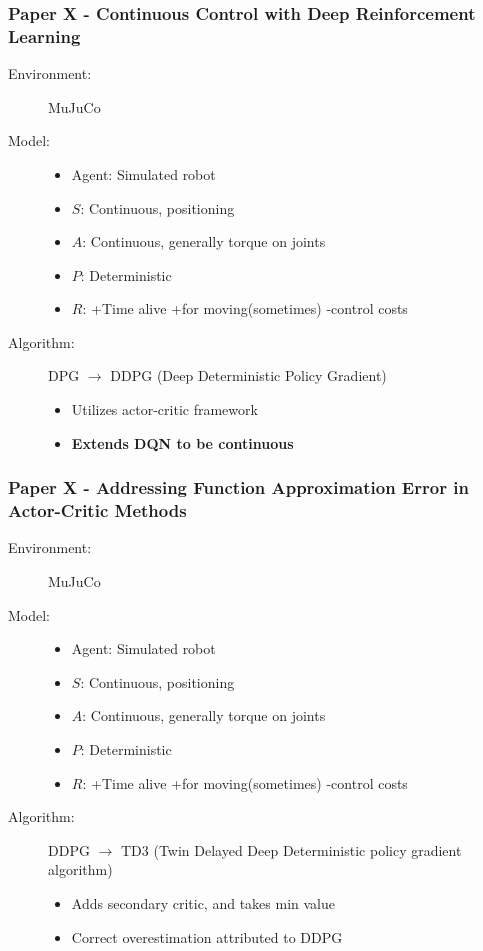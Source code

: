 \documentclass{beamer}
\begin{document}
\begin{frame} %
    \frametitle{Paper X - Continuous Control with Deep Reinforcement Learning%
    }
    \begin{description}
        \item[Environment:] MuJuCo
        \item[Model:]
        \begin{itemize}
            \item Agent: Simulated robot
            \item $S$: Continuous, positioning
            \item $A$: Continuous, generally torque on joints
            \item $P$: Deterministic
            \item $R$: +Time alive +for moving(sometimes) -control costs
        \end{itemize}
        \item[Algorithm:] DPG\cite{silver2014} $\rightarrow$ DDPG 
            (Deep Deterministic Policy Gradient)
        \begin{itemize}
            \item Utilizes actor-critic framework
            \item \textbf{Extends DQN to be continuous}
        \end{itemize}
    \end{description}
\end{frame}

\begin{frame} %
    \frametitle{Paper X - Addressing Function Approximation Error in Actor-Critic 
    Methods}
    \begin{description}
        \item[Environment:] MuJuCo
        \item[Model:]
        \begin{itemize}
            \item Agent: Simulated robot
            \item $S$: Continuous, positioning
            \item $A$: Continuous, generally torque on joints
            \item $P$: Deterministic
            \item $R$: +Time alive +for moving(sometimes) -control costs
        \end{itemize}
        \item[Algorithm:] DDPG $\rightarrow$ TD3 
        (Twin Delayed Deep Deterministic policy gradient algorithm)
        \begin{itemize}
            \item Adds secondary critic, and takes min value
            \item Correct overestimation attributed to DDPG %
        \end{itemize}
    \end{description}
\end{frame}
\end{document}
